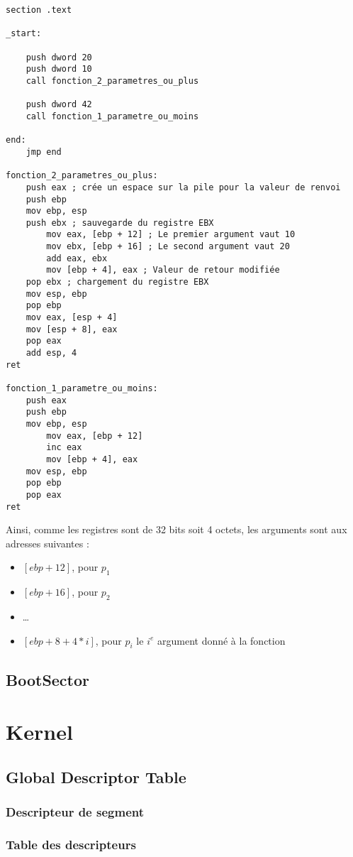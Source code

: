 \documentclass{book}
\begin{document}
\begin{verbatim}
section .text

_start:

	push dword 20
	push dword 10
	call fonction_2_parametres_ou_plus

	push dword 42
	call fonction_1_parametre_ou_moins

end:
	jmp end

fonction_2_parametres_ou_plus:
	push eax ; crée un espace sur la pile pour la valeur de renvoi
	push ebp
	mov ebp, esp
	push ebx ; sauvegarde du registre EBX
		mov eax, [ebp + 12] ; Le premier argument vaut 10
		mov ebx, [ebp + 16] ; Le second argument vaut 20
		add eax, ebx
		mov [ebp + 4], eax ; Valeur de retour modifiée
	pop ebx ; chargement du registre EBX
	mov esp, ebp
	pop ebp
	mov eax, [esp + 4]
	mov [esp + 8], eax
	pop eax
	add esp, 4
ret

fonction_1_parametre_ou_moins:
	push eax
	push ebp
	mov ebp, esp
		mov eax, [ebp + 12]
		inc eax
		mov [ebp + 4], eax
	mov esp, ebp
	pop ebp
	pop eax
ret
\end{verbatim}
Ainsi, comme les registres sont de 32 bits soit 4 octets, les arguments sont aux adresses suivantes :
\begin{itemize}
	\item $[ebp + 12]$, pour $p_{1}$
	\item $[ebp + 16]$, pour $p_{2}$
	\item \dots
	\item $[ebp + 8 + 4 * i]$, pour $p_{i}$ le $i^{e}$ argument donné à la fonction
\end{itemize}
\section{BootSector}
\chapter{Kernel}
\section{Global Descriptor Table}
\subsection{Descripteur de segment}
\subsection{Table des descripteurs}
\end{document}
